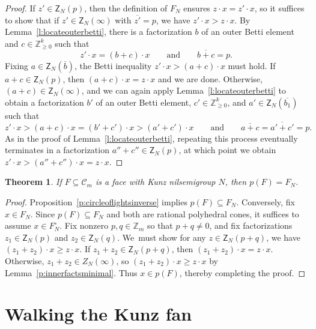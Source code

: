 \documentclass[10pt,a4paper]{amsart}
\newcommand\ZZ{\mathbb{Z}}
\newcommand\cC{{\mathcal C}}
\newtheorem{thm}{Theorem}[section]
\theoremstyle{definition}\newtheorem{defi}[thm]{Definition}
\begin{document}
\begin{proof}
If $z' \in \mathsf{Z}_N(p)$, then the definition of $F_N$ ensures $z \cdot x = z'\cdot x$, so it suffices to show that if $z' \in \mathsf{Z}_N(\infty)$ with $\overline{z'} = p$, we have $z' \cdot x > z \cdot x$.  By Lemma~\ref{l:locateouterbetti}, there is a factorization $b$ of an outer Betti element and $c \in \ZZ_{\geq 0}^k$ such that 
\[
z' \cdot x = (b + c) \cdot x
\qquad \text{and} \qquad
\overline{b+c} = p.
\]
Fixing $a \in \mathsf{Z}_N(\overline{b})$, the Betti inequality $z' \cdot x > (a+c) \cdot x$ must hold.  If $a + c \in \mathsf{Z}_N(p)$, then $(a + c) \cdot x = z \cdot x$ and we are done.  Otherwise, $(a+c) \in \mathsf{Z}_N(\infty)$, and we can again apply Lemma~\ref{l:locateouterbetti} to obtain a factorization $b'$ of an outer Betti element, $c' \in \ZZ_{\ge 0}^k$, and $a' \in \mathsf{Z}_N(\overline{b_1})$ such that 
\[
z' \cdot x > (a+c) \cdot x = (b' + c') \cdot x > (a' + c')\cdot x
\qquad \text{and} \qquad
\overline{a+c} = \overline{a' + c'} = p.
\]
As in the proof of Lemma~\ref{l:locateouterbetti}, repeating this process eventually terminates in a factorization $a'' + c'' \in \mathsf Z_N(p)$, at which point we obtain $z' \cdot x > (a'' + c'') \cdot x = z \cdot x$.  
\end{proof}

\setcounter{thm}{7}
\begin{thm}\label{t:outerbettihdesc}
If $F \subseteq \cC_m$ is a face with Kunz nilsemigroup $N$, then $p(F) = F_N$.
\end{thm}

\begin{proof}
Proposition~\ref{p:circleoflightsinverse} implies $p(F) \subseteq F_N$.  Conversely, fix $x \in F_N$.  Since $p(F) \subseteq F_N$ and both are rational polyhedral cones, it suffices to assume $x \in F_N^\circ$.  Fix nonzero $p, q \in \ZZ_m$ so that $p + q \ne 0$, and fix factorizations $z_1 \in \mathsf{Z}_N(p)$ and $z_2 \in \mathsf{Z}_N(q)$. We~must show for any $z \in \mathsf{Z}_N(p + q)$, we have $(z_1+z_2)\cdot x \geq z \cdot x$. If $z_1 + z_2 \in \mathsf{Z}_N(p + q)$, then $(z_1 + z_2) \cdot x = z \cdot x$.  Otherwise, $z_1 + z_2 \in Z_N(\infty)$, so $(z_1 + z_2)\cdot x \geq z \cdot x$ by Lemma~\ref{p:innerfactsminimal}.  Thus $x \in p(F)$, thereby completing the proof.
\end{proof}

\section{Walking the Kunz fan}
\label{sec:kunzwalk}
\end{document}
